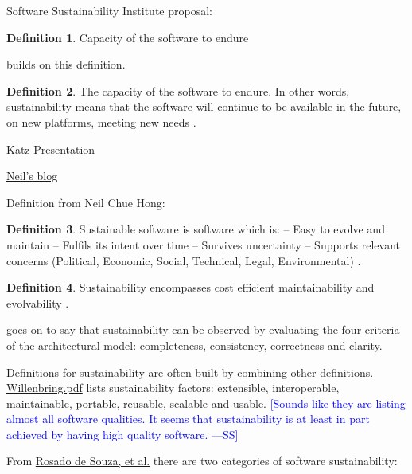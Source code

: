 \documentclass[letterpaper, cleveref]{lipics-v2019}
\newcommand{\authornote}[3]{\textcolor{#1}{[#3 ---#2]}}
\newcommand{\authornote}[3]{}
\newcommand{\wss}[1]{\authornote{blue}{SS}{#1}} %
\theoremstyle{definition}
\newtheorem{defn}{Definition}
\begin{document}
Software Sustainability Institute proposal:

\begin{defn}
Capacity of the software to endure
\end{defn}

\citet{Katz2016} builds on this definition.

\begin{defn}
  \noindent The capacity of the software to endure. In other words,
  sustainability means that the software will continue to be available in
  the future, on new platforms, meeting new needs \citep{Katz2016}.
\end{defn}

\href{https://collegeville.github.io/CW3S19/WorkshopResources/Presentations/4-5-Katz_data-driven-software-sustainability.pdf}
{Katz Presentation}

\href{https://www.software.ac.uk/blog/2019-09-12-making-open-source-research-software-visible-path-better-sustainability}
{Neil's blog}

Definition from Neil Chue Hong:
\begin{defn}
	Sustainable software is software which is:
	-- Easy to evolve and maintain
	-- Fulfils its intent over time
	-- Survives uncertainty
	-- Supports relevant concerns (Political, Economic, Social, Technical,
	Legal, Environmental) \citep{Katz2016}.
\end{defn}

\begin{defn}
Sustainability encompasses cost efficient maintainability and evolvability
\citep{SehestedtEtAl2014}.
\end{defn}

\citet{SehestedtEtAl2014} goes on to say that sustainability can be observed
by evaluating the four criteria of the architectural model: completeness,
consistency, correctness and clarity.

Definitions for sustainability are often built by combining other definitions.
\href{https://collegeville.github.io/CW3S19/WorkshopResources/Presentations/1-4-2019CollegevilleWorkshopWillenbring.pdf}
{Willenbring.pdf}
lists sustainability factors: extensible, interoperable, maintainable,
portable, reusable, scalable and usable.  \wss{Sounds like they are listing
almost all software qualities.  It seems that sustainability is at least in
part achieved by having high quality software.}

From
\href{https://figshare.com/articles/Defining_Sustainability_through_Developers_Eyes_Recommendations_from_an_Interview_Study/1111925/1}
{Rosado de Souza, et al.} there are two categories of software sustainability:
\end{document}
